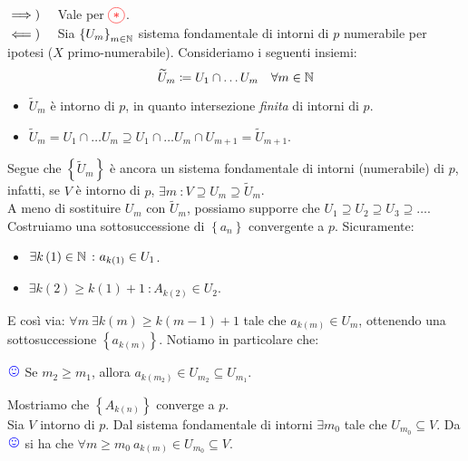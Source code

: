 \begin{demonstration}
	$\implies)\quad$ Vale per $\textcolor{red}{\circled{\ast}}$.\\
	$\impliedby)\quad$ Sia $\left\{U_m\right\}_{m\in\mathbb{N}}$ sistema fondamentale di intorni di $p$ numerabile per ipotesi ($X$ primo-numerabile). Consideriamo i seguenti insiemi:
	\begin{equation*}
	\widetilde{U}_m\coloneqq U_1\cap\ldots U_m\quad \forall m\in \mathbb{N}
	\end{equation*}
\begin{itemize}
	\item $\widetilde{U}_m$ è intorno di $p$, in quanto intersezione \textit{finita} di intorni di $p$.
	\item $\widetilde{U}_m=U_1\cap\ldots U_m\supseteq U_1\cap\ldots U_m\cap U_{m+1}=\widetilde{U}_{m+1}$.
\end{itemize}
Segue che $\left\{\widetilde{U}_m\right\}$ è ancora un sistema fondamentale di intorni (numerabile) di $p$, infatti, se $V$ è intorno di $p$, $\exists m\ \colon V\supseteq U_m\supseteq \widetilde{U}_m$.\\
A meno di sostituire $U_m$ con $\widetilde{U}_m$, possiamo supporre che $U_1\supseteq U_2\supseteq U_3\supseteq \ldots$.\\
Costruiamo una sottosuccessione di $\left\{a_n\right\}$ convergente a $p$. Sicuramente:
\begin{itemize}
	\item $\exists k\left(1\right)\in \mathbb{N}\ \colon a_{k\left(1\right)}\in U_1$.
	\item $\exists k\left(2\right)\geq k\left(1\right)+1\ \colon A_{k\left(2\right)}\in U_2$.
\end{itemize}
E così via: $\forall m\ \exists k\left(m\right)\geq k\left(m-1\right)+1$ tale che $a_{k\left(m\right)}\in U_m$, ottenendo una sottosuccessione $\left\{a_{k\left(m\right)}\right\}$. Notiamo in particolare che:
\begin{center}
\label{notasorridente} $\textcolor{blue}{{\large \smiley{}}}$ Se $m_2\geq m_1$, allora $a_{k\left(m_2\right)}\in U_{m_2}\subseteq U_{m_1}$.
\end{center}
Mostriamo che $\left\{A_{k\left(n\right)}\right\}$ converge a $p$.\\
Sia $V$ intorno di $p$. Dal sistema fondamentale di intorni $\exists m_0$ tale che $U_{m_0}\subseteq V$. Da $\textcolor{blue}{{\large \smiley{}}}$ si ha che $\forall m\geq m_0\ a_{k\left(m\right)}\in U_{m_0}\subseteq V$.
\end{demonstration}

